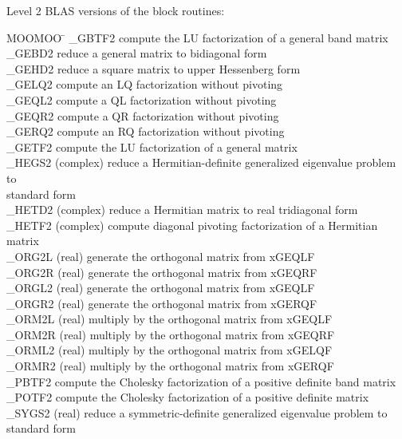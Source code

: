 \noindent
Level 2 BLAS versions of the block routines:
\begin{tabbing}
MOOMOO \= \kill
\_GBTF2 \> compute the LU factorization of a general band matrix \\
\_GEBD2 \> reduce a general matrix to bidiagonal form \\
\_GEHD2 \> reduce a square matrix to upper Hessenberg form \\
\_GELQ2 \> compute an LQ factorization without pivoting \\
\_GEQL2 \> compute a QL factorization without pivoting \\
\_GEQR2 \> compute a QR factorization without pivoting \\
\_GERQ2 \> compute an RQ factorization without pivoting \\
\_GETF2 \> compute the LU factorization of a general matrix \\
\_HEGS2 \> (complex) reduce a Hermitian-definite generalized eigenvalue problem to \\
        \> standard form \\
\_HETD2 \> (complex) reduce a Hermitian matrix to real tridiagonal form \\
\_HETF2 \> (complex) compute diagonal pivoting factorization of a Hermitian matrix \\
\_ORG2L \> (real) generate the orthogonal matrix from xGEQLF \\
\_ORG2R \> (real) generate the orthogonal matrix from xGEQRF \\
\_ORGL2 \> (real) generate the orthogonal matrix from xGEQLF \\
\_ORGR2 \> (real) generate the orthogonal matrix from xGERQF \\
\_ORM2L \> (real) multiply by the orthogonal matrix from xGEQLF \\
\_ORM2R \> (real) multiply by the orthogonal matrix from xGEQRF \\
\_ORML2 \> (real) multiply by the orthogonal matrix from xGELQF \\
\_ORMR2 \> (real) multiply by the orthogonal matrix from xGERQF \\
\_PBTF2 \> compute the Cholesky factorization of a positive definite band matrix \\
\_POTF2 \> compute the Cholesky factorization of a positive definite matrix \\
\_SYGS2 \> (real) reduce a symmetric-definite generalized eigenvalue problem to \\
        \> standard form \\

\end{tabbing}
